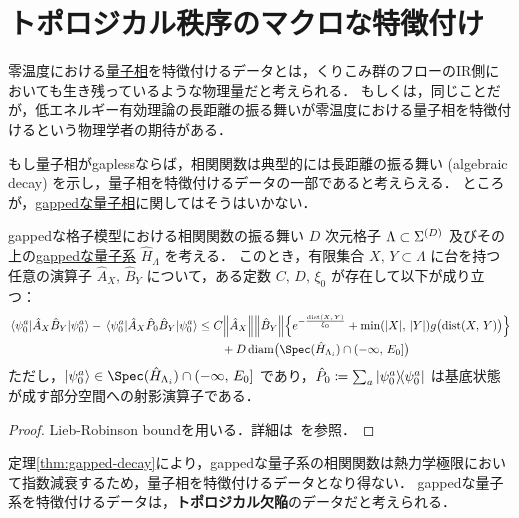 \documentclass[TQFT_main]{subfiles}
\begin{document}
\section{トポロジカル秩序のマクロな特徴付け}

零温度における\hyperref[def:quantum-phase]{量子相}を特徴付けるデータとは，くりこみ群のフローのIR側においても生き残っているような物理量だと考えられる．
もしくは，同じことだが，低エネルギー有効理論の長距離の振る舞いが零温度における量子相を特徴付けるという物理学者の期待がある．

もし量子相がgaplessならば，相関関数は典型的には長距離の振る舞い (algebraic decay) を示し，量子相を特徴付けるデータの一部であると考えらえる．
ところが，\hyperref[def:quantum-phase]{gappedな量子相}に関してはそうはいかない．

\begin{mytheo}[label=thm:gapped-decay]{gappedな格子模型における相関関数の振る舞い}
    $D$ 次元格子 $\Lambda \subset \Sigma^{(D)}$ 及びその上の\hyperref[def:gapped]{gappedな量子系} $\hat{H}_\Lambda$ を考える．
    このとき，有限集合 $X,\, Y \subset \Lambda$ に台を持つ任意の演算子 $\hat{A}_X,\, \hat{B}_Y$ について，ある定数 $C,\, D,\, \xi_0$ が存在して以下が成り立つ：
    \begin{align}
        \mel{\psi_0^a}{\hat{A}_X \hat{B}_Y}{\psi_0^a} - \mel{\psi_0^a}{\hat{A}_X \hat{P}_0 \hat{B}_Y}{\psi_0^a} 
        &\le C  \norm{\hat{A}_X} \norm{\hat{B}_Y} \Bigl\{ e^{- \frac{\mathrm{dist} (X,\, Y)}{\xi_0}} + \min (\abs{X},\, \abs{Y}) g \bigl(\mathrm{dist} (X,\, Y) \bigr) \Bigr\} \\
        &\qquad + D\, \mathrm{diam}\bigl(\Spec (\hat{H}_{\Lambda_i}) \cap (-\infty,\, E_0] \bigr)
    \end{align}
    ただし，$\ket{\psi_0^a} \in \Spec (\hat{H}_{\Lambda_i}) \cap (-\infty,\, E_0]$ であり，$\hat{P}_0 \coloneqq \sum_a \ketbra{\psi_0^a}{\psi_0^a}$ は基底状態が成す部分空間への射影演算子である．
\end{mytheo}

\begin{proof}
    Lieb-Robinson boundを用いる．詳細は~\cite[Theorem 2, p.7]{Hastings2010localityquantumsystems}を参照．
\end{proof}

定理\ref{thm:gapped-decay}により，gappedな量子系の相関関数は熱力学極限において指数減衰するため，量子相を特徴付けるデータとなり得ない．
gappedな量子系を特徴付けるデータは，\textbf{トポロジカル欠陥}のデータだと考えられる．
\end{document}
